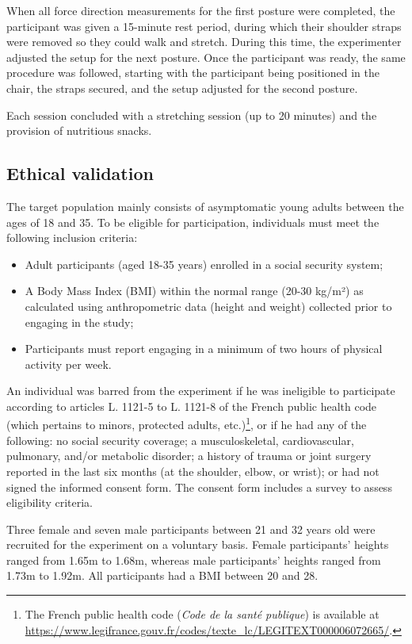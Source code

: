 When all force direction measurements for the first posture were completed, the participant was given a 15-minute rest period, during which their shoulder straps were removed so they could walk and stretch. During this time, the experimenter adjusted the setup for the next posture. Once the participant was ready, the same procedure was followed, starting with the participant being positioned in the chair, the straps secured, and the setup adjusted for the second posture.

Each session concluded with a stretching session (up to 20 minutes) and the provision of nutritious snacks.

\subsection{Ethical validation}
The target population mainly consists of asymptomatic young adults between the ages of 18 and 35. To be eligible for participation, individuals must meet the following inclusion criteria:

\begin{itemize}[noitemsep]
    \item Adult participants (aged 18-35 years) enrolled in a social security system;
    \item A Body Mass Index (BMI) within the normal range (20-30 kg/m²) as calculated using anthropometric data (height and weight) collected prior to engaging in the study;
    \item Participants must report engaging in a minimum of two hours of physical activity per week.
\end{itemize}

An individual was barred from the experiment if he was ineligible to participate according to articles L. 1121-5 to L. 1121-8 of the French public health code (which pertains to minors, protected adults, etc.)\footnote{The French public health code (\emph{Code de la santé publique}) is available at \url{https://www.legifrance.gouv.fr/codes/texte_lc/LEGITEXT000006072665/}.}, or if he had any of the following: no social security coverage; a musculoskeletal, cardiovascular, pulmonary, and/or metabolic disorder; a history of trauma or joint surgery reported in the last six months (at the shoulder, elbow, or wrist); or had not signed the informed consent form. The consent form includes a survey to assess eligibility criteria.

Three female and seven male participants between 21 and 32 years old were recruited for the experiment on a voluntary basis. Female participants' heights ranged from 1.65m to 1.68m, whereas male participants' heights ranged from 1.73m to 1.92m. All participants had a BMI between 20 and 28.

